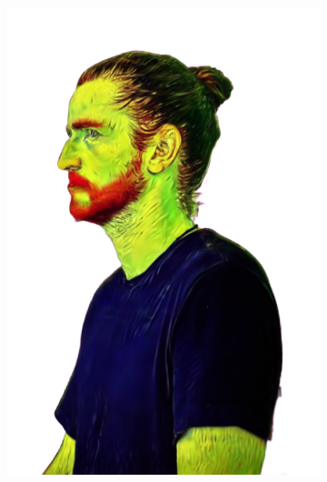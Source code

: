 \begin{figure}[ht]
\begin{subfigure}{0.2\linewidth}
		\includegraphics[width=\textwidth]{Figures/results/high/ephra_vangogh/26_render.png}

\end{subfigure}
\end{figure}
